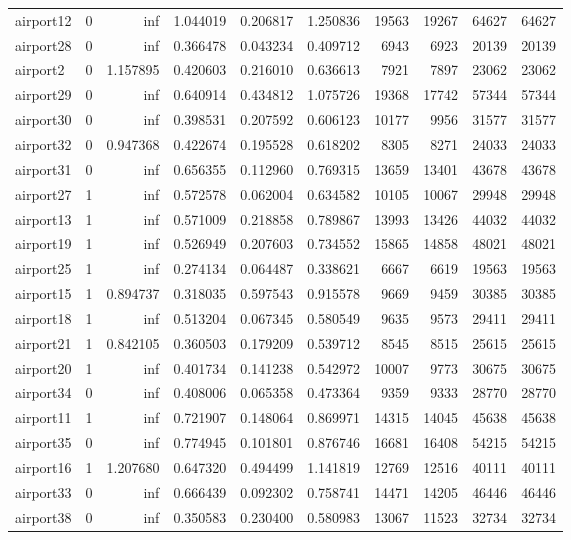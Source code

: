 \begin{longtable}{|l|r|r|r|r|r|r|r|r|r|}
airport12 & 0 & inf & 1.044019 & 0.206817 & 1.250836 & 19563 & 19267 & 64627 & 64627 \\
airport28 & 0 & inf & 0.366478 & 0.043234 & 0.409712 & 6943 & 6923 & 20139 & 20139 \\
airport2 & 0 & 1.157895 & 0.420603 & 0.216010 & 0.636613 & 7921 & 7897 & 23062 & 23062 \\
airport29 & 0 & inf & 0.640914 & 0.434812 & 1.075726 & 19368 & 17742 & 57344 & 57344 \\
airport30 & 0 & inf & 0.398531 & 0.207592 & 0.606123 & 10177 & 9956 & 31577 & 31577 \\
airport32 & 0 & 0.947368 & 0.422674 & 0.195528 & 0.618202 & 8305 & 8271 & 24033 & 24033 \\
airport31 & 0 & inf & 0.656355 & 0.112960 & 0.769315 & 13659 & 13401 & 43678 & 43678 \\
airport27 & 1 & inf & 0.572578 & 0.062004 & 0.634582 & 10105 & 10067 & 29948 & 29948 \\
airport13 & 1 & inf & 0.571009 & 0.218858 & 0.789867 & 13993 & 13426 & 44032 & 44032 \\
airport19 & 1 & inf & 0.526949 & 0.207603 & 0.734552 & 15865 & 14858 & 48021 & 48021 \\
airport25 & 1 & inf & 0.274134 & 0.064487 & 0.338621 & 6667 & 6619 & 19563 & 19563 \\
airport15 & 1 & 0.894737 & 0.318035 & 0.597543 & 0.915578 & 9669 & 9459 & 30385 & 30385 \\
airport18 & 1 & inf & 0.513204 & 0.067345 & 0.580549 & 9635 & 9573 & 29411 & 29411 \\
airport21 & 1 & 0.842105 & 0.360503 & 0.179209 & 0.539712 & 8545 & 8515 & 25615 & 25615 \\
airport20 & 1 & inf & 0.401734 & 0.141238 & 0.542972 & 10007 & 9773 & 30675 & 30675 \\
airport34 & 0 & inf & 0.408006 & 0.065358 & 0.473364 & 9359 & 9333 & 28770 & 28770 \\
airport11 & 1 & inf & 0.721907 & 0.148064 & 0.869971 & 14315 & 14045 & 45638 & 45638 \\
airport35 & 0 & inf & 0.774945 & 0.101801 & 0.876746 & 16681 & 16408 & 54215 & 54215 \\
airport16 & 1 & 1.207680 & 0.647320 & 0.494499 & 1.141819 & 12769 & 12516 & 40111 & 40111 \\
airport33 & 0 & inf & 0.666439 & 0.092302 & 0.758741 & 14471 & 14205 & 46446 & 46446 \\
airport38 & 0 & inf & 0.350583 & 0.230400 & 0.580983 & 13067 & 11523 & 32734 & 32734 \\

\end{longtable}
